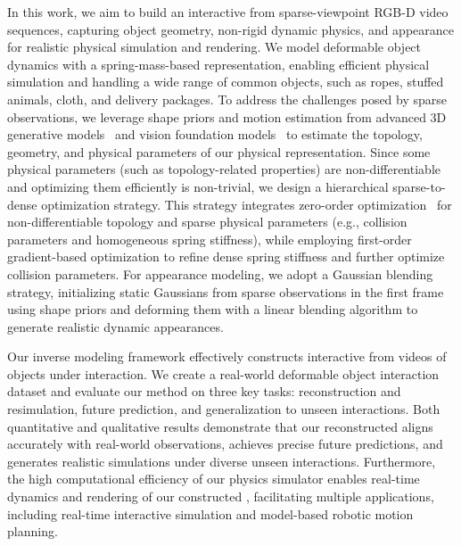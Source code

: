 In this work, we aim to build an interactive \ourabbr from sparse-viewpoint RGB-D video sequences, capturing object geometry, non-rigid dynamic physics, and appearance for realistic physical simulation and rendering. 
We model deformable object dynamics with a spring-mass-based representation, enabling efficient physical simulation and handling a wide range of common objects, such as ropes, stuffed animals, cloth, and delivery packages.
To address the challenges posed by sparse observations, we leverage shape priors and motion estimation from advanced 3D generative models~\cite{xiang2024structured} and vision foundation models~\cite{ren2024grounded, karaev2024cotracker3, rombach2022high} to estimate the topology, geometry, and physical parameters of our physical representation. 
Since some physical parameters (such as topology-related properties) are non-differentiable and optimizing them efficiently is non-trivial, we design a hierarchical sparse-to-dense optimization strategy. This strategy integrates zero-order optimization~\cite{hansen2006cma} for non-differentiable topology and sparse physical parameters (e.g., collision parameters and homogeneous spring stiffness), while employing first-order gradient-based optimization to refine dense spring stiffness and further optimize collision parameters.
For appearance modeling, we adopt a Gaussian blending strategy, initializing static Gaussians from sparse observations in the first frame using shape priors and deforming them with a linear blending algorithm to generate realistic dynamic appearances.

Our inverse modeling framework effectively constructs interactive \ourabbr from videos of objects under interaction. We create a real-world deformable object interaction dataset and evaluate our method on three key tasks: reconstruction and resimulation, future prediction, and generalization to unseen interactions. Both quantitative and qualitative results demonstrate that our reconstructed \ourabbr aligns accurately with real-world observations, achieves precise future predictions, and generates realistic simulations under diverse unseen interactions. Furthermore, the high computational efficiency of our physics simulator enables real-time dynamics and rendering of our constructed \ourabbr, facilitating multiple applications, including real-time interactive simulation and model-based robotic motion planning.

